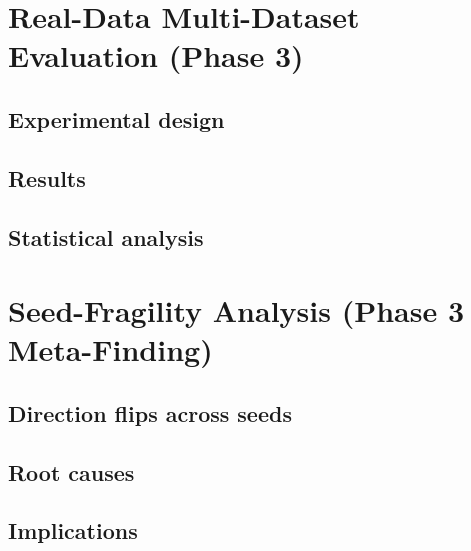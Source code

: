 \documentclass[preprint,12pt]{elsarticle}
\begin{document}
\section{Real-Data Multi-Dataset Evaluation (Phase 3)}
\label{sec:phase3}

\subsection{Experimental design}

\subsection{Results}

\subsection{Statistical analysis}

\section{Seed-Fragility Analysis (Phase 3 Meta-Finding)}
\label{sec:fragility}

\subsection{Direction flips across seeds}

\subsection{Root causes}

\subsection{Implications}
\end{document}
